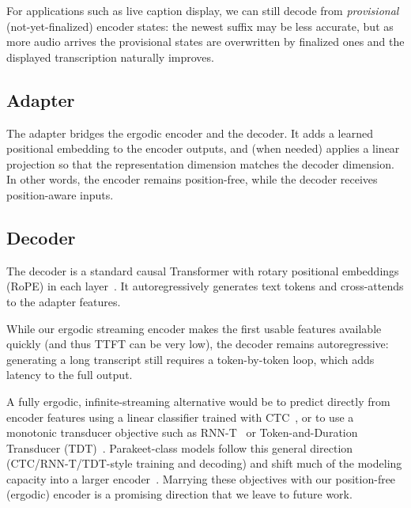 For applications such as live caption display, we can still decode from
\emph{provisional} (not-yet-finalized) encoder states: the newest suffix may be
less accurate, but as more audio arrives the provisional states are overwritten
by finalized ones and the displayed transcription naturally improves.

\subsection{Adapter}
The adapter bridges the ergodic encoder and the decoder. It adds a learned
positional embedding to the encoder outputs, and (when needed) applies a linear
projection so that the representation dimension matches the decoder dimension.
In other words, the encoder remains position-free, while the decoder receives
position-aware inputs.

\subsection{Decoder}
The decoder is a standard causal Transformer with rotary positional embeddings
(RoPE) in each layer~\citep{su2023roformerenhancedtransformerrotary}. It
autoregressively generates text tokens and cross-attends to the adapter
features.

While our ergodic streaming encoder makes the first usable features available
quickly (and thus TTFT can be very low), the decoder remains autoregressive:
generating a long transcript still requires a token-by-token loop, which adds
latency to the full output.

A fully ergodic, infinite-streaming alternative would be to predict directly
from encoder features using a linear classifier trained with
CTC~\citep{graves2006ctc}, or to use a monotonic transducer objective such as
RNN-T~\citep{graves2012rnnt} or Token-and-Duration Transducer
(TDT)~\citep{xu2023tdt}. Parakeet-class models follow this general direction
(CTC/RNN-T/TDT-style training and decoding) and shift much of the modeling
capacity into a larger encoder~\citep{rekesh2023fastconformer}. Marrying these
objectives with our position-free (ergodic) encoder is a promising direction
that we leave to future work.
